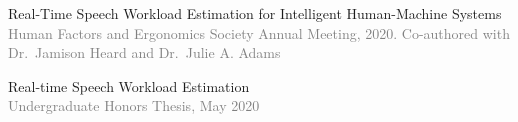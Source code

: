 \documentclass[12pt]{article} %
\renewcommand{\emph}[1]{%
  \textcolor{gray}{#1}%
}
\begin{document}
\begin{paracol}{2}
\begin{raggedright}
\vspace{1pt}

Real-Time Speech Workload Estimation for Intelligent Human-Machine
Systems\\
\emph{Human Factors and Ergonomics Society Annual Meeting, 2020.
Co-authored with Dr.~Jamison Heard and Dr.~Julie A. Adams}

Real-time Speech Workload Estimation\\
\emph{Undergraduate Honors Thesis, May 2020}

\end{raggedright}
\end{paracol}
\end{document}
